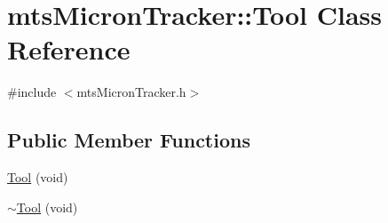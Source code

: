\hypertarget{classmts_micron_tracker_1_1_tool}{\section{mts\-Micron\-Tracker\-:\-:Tool Class Reference}
\label{classmts_micron_tracker_1_1_tool}
}


{\ttfamily \#include $<$mts\-Micron\-Tracker.\-h$>$}

\subsection*{Public Member Functions}
\begin{DoxyCompactItemize}
\item 
\hyperlink{classmts_micron_tracker_1_1_tool_a4a406799195f7c0ff15a7970aa6bf9dd}{Tool} (void)
\item 
\hyperlink{classmts_micron_tracker_1_1_tool_a3c2b24ccc1b4a8f5e678810b7040c417}{$\sim$\-Tool} (void)
\end{DoxyCompactItemize}
